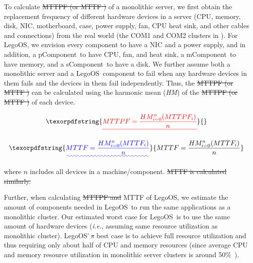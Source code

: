 \documentclass[10pt,times,twocolumn]{z2-article}
\renewcommand{\em}{\it}
\newcommand{\ie}{\textit{i.e.}}
\newcommand{\lego}{LegoOS}
\newcommand{\pcomponent}{pComponent}
\newcommand{\mcomponent}{mComponent}
\newcommand{\scomponent}{sComponent}
\providecommand{\DIFaddtex}[1]{{\protect\color{blue}\uwave{#1}}} %
\providecommand{\DIFdeltex}[1]{{\protect\color{red}\sout{#1}}}                      %
\providecommand{\DIFaddbegin}{} %
\providecommand{\DIFaddend}{} %
\providecommand{\DIFdelbegin}{} %
\providecommand{\DIFdelend}{} %
\providecommand{\DIFadd}[1]{\texorpdfstring{\DIFaddtex{#1}}{#1}} %
\providecommand{\DIFdel}[1]{\texorpdfstring{\DIFdeltex{#1}}{}} %
\newcommand{\DIFscaledelfig}{0.5}
\newlength{\DIFdelgraphicswidth} %
\newlength{\DIFdelgraphicsheight} %
\newcommand{\DIFaddincludegraphics}[2][]{{\color{blue}\fbox{\DIFOincludegraphics[#1]{#2}}}} %
\newcommand{\DIFdelincludegraphics}[2][]{%
\sbox{\DIFdelgraphicsbox}{\DIFOincludegraphics[#1]{#2}}%
\settoboxwidth{\DIFdelgraphicswidth}{\DIFdelgraphicsbox} %
\settoboxtotalheight{\DIFdelgraphicsheight}{\DIFdelgraphicsbox} %
\scalebox{\DIFscaledelfig}{%
\parbox[b]{\DIFdelgraphicswidth}{\usebox{\DIFdelgraphicsbox}\\[-\baselineskip] \rule{\DIFdelgraphicswidth}{0em}}\llap{\resizebox{\DIFdelgraphicswidth}{\DIFdelgraphicsheight}{%
\setlength{\unitlength}{\DIFdelgraphicswidth}%
\begin{picture}(1,1)%
\thicklines\linethickness{2pt} %
{\color[rgb]{1,0,0}\put(0,0){\framebox(1,1){}}}%
{\color[rgb]{1,0,0}\put(0,0){\line( 1,1){1}}}%
{\color[rgb]{1,0,0}\put(0,1){\line(1,-1){1}}}%
\end{picture}%
}\hspace*{3pt}}} %
} %
\DeclareRobustCommand{\DIFaddbegin}{\DIFOaddbegin \let\includegraphics\DIFaddincludegraphics} %
\DeclareRobustCommand{\DIFaddend}{\DIFOaddend \let\includegraphics\DIFOincludegraphics} %
\DeclareRobustCommand{\DIFdelbegin}{\DIFOdelbegin \let\includegraphics\DIFdelincludegraphics} %
\DeclareRobustCommand{\DIFdelend}{\DIFOaddend \let\includegraphics\DIFOincludegraphics} %
\begin{document}
{{{{{{{To calculate \DIFdelbegin \DIFdel{MTTPF (or MTTF ) }\DIFdelend \DIFaddbegin \DIFadd{MTTF }\DIFaddend of a monolithic server, we first obtain the replacement frequency of different hardware devices in a server
(CPU, memory, disk, NIC, motherboard, case, power supply, fan, CPU heat sink, and other cables and connections)
from the real world (the COM1 and COM2 clusters in \cite{Failure-Disk-FAST07}).
For \lego, we envision every component to have a NIC and a power supply, 
and in addition, a \pcomponent\ to have CPU, fan, and heat sink, a \mcomponent\ to have memory, and a \scomponent\ to have a disk.
We further assume both a monolithic server and a \lego\ component to fail when any hardware devices in them fails
and the devices in them fail independently.
Thus, the \DIFdelbegin \DIFdel{MTTPF (or MTTF ) }\DIFdelend \DIFaddbegin \DIFadd{MTTF }\DIFaddend can be calculated using the harmonic mean ({\em HM}) 
of the \DIFdelbegin \DIFdel{MTTPF (or MTTF ) }\DIFdelend \DIFaddbegin \DIFadd{MTTF }\DIFaddend of each device.

\DIFdelbegin \begin{displaymath}
\DIFdel{MTTPF = \frac{HM_{i=0}^n(MTTPF_i)}{n}
}\end{displaymath}
\DIFdelend \DIFaddbegin \vspace{-0.1in}
\DIFaddend 

\DIFaddbegin \begin{small}
\begin{equation}
\DIFadd{MTTF = \frac{HM_{i=0}^n(MTTF_i)}{n}
}\end{equation}
\end{small}

\vspace{-0.1in}

\DIFaddend where $n$ includes all devices in a machine/component. 
\DIFdelbegin \DIFdel{MTTF is calculated similarly.
}\DIFdelend 

Further, when calculating \DIFdelbegin \DIFdel{MTTPF and }\DIFdelend MTTF of \lego, we estimate the amount of components needed in \lego\ 
to run the same applications as a monolithic cluster.
Our estimated worst case for \lego\ is to use the same amount of hardware devices 
(\ie, assuming same resource utilization as monolithic cluster).
\lego' \DIFdelbegin \DIFdel{s }\DIFdelend best case is to achieve full resource utilization 
and thus requiring only about half of CPU and memory resources 
(since average CPU and memory resource utilization in monolithic server clusters is around 50\%~\cite{GoogleTrace,AliTrace}).

}}}}}}}
\end{document}

